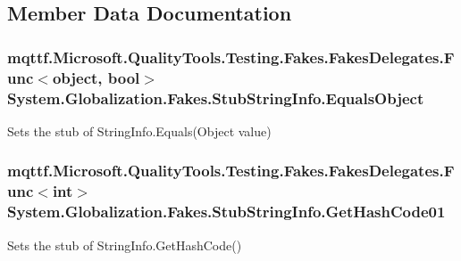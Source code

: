 \subsection{Member Data Documentation}
\hypertarget{class_system_1_1_globalization_1_1_fakes_1_1_stub_string_info_aacbc1e7417b8a739e2cbe10001f6fdca}{
\subsubsection[{Equals\-Object}]{\setlength{\rightskip}{0pt plus 5cm}mqttf.\-Microsoft.\-Quality\-Tools.\-Testing.\-Fakes.\-Fakes\-Delegates.\-Func$<$object, bool$>$ System.\-Globalization.\-Fakes.\-Stub\-String\-Info.\-Equals\-Object}}\label{class_system_1_1_globalization_1_1_fakes_1_1_stub_string_info_aacbc1e7417b8a739e2cbe10001f6fdca}


Sets the stub of String\-Info.\-Equals(\-Object value)

\hypertarget{class_system_1_1_globalization_1_1_fakes_1_1_stub_string_info_abe07c7d4e2b15ed4b750aff96b31668c}{
\subsubsection[{Get\-Hash\-Code01}]{\setlength{\rightskip}{0pt plus 5cm}mqttf.\-Microsoft.\-Quality\-Tools.\-Testing.\-Fakes.\-Fakes\-Delegates.\-Func$<$int$>$ System.\-Globalization.\-Fakes.\-Stub\-String\-Info.\-Get\-Hash\-Code01}}\label{class_system_1_1_globalization_1_1_fakes_1_1_stub_string_info_abe07c7d4e2b15ed4b750aff96b31668c}


Sets the stub of String\-Info.\-Get\-Hash\-Code()



